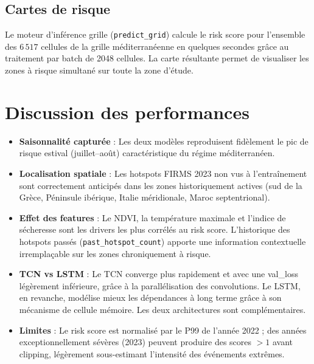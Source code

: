 \documentclass[12pt,a4paper]{report}
\begin{document}
\subsection{Cartes de risque}

Le moteur d'inférence grille (\texttt{predict\_grid}) calcule le risk score pour
l'ensemble des $6\,517$ cellules de la grille méditerranéenne en quelques secondes
grâce au traitement par batch de 2048 cellules. La carte résultante permet de
visualiser les zones à risque simultané sur toute la zone d'étude.

\section{Discussion des performances}

\begin{firebox}[title=Points clés d'analyse]
\begin{itemize}[leftmargin=*,itemsep=4pt]
  \item \textbf{Saisonnalité capturée} : Les deux modèles reproduisent fidèlement le
    pic de risque estival (juillet–août) caractéristique du régime méditerranéen.

  \item \textbf{Localisation spatiale} : Les hotspots FIRMS 2023 non vus à l'entraînement
    sont correctement anticipés dans les zones historiquement actives (sud de la Grèce,
    Péninsule ibérique, Italie méridionale, Maroc septentrional).

  \item \textbf{Effet des features} : Le NDVI, la température maximale et l'indice de
    sécheresse sont les drivers les plus corrélés au risk score. L'historique des
    hotspots passés (\texttt{past\_hotspot\_count}) apporte une information contextuelle
    irremplaçable sur les zones chroniquement à risque.

  \item \textbf{TCN vs LSTM} : Le TCN converge plus rapidement et avec une val\_loss
    légèrement inférieure, grâce à la parallélisation des convolutions. Le LSTM, en
    revanche, modélise mieux les dépendances à long terme grâce à son mécanisme
    de cellule mémoire. Les deux architectures sont complémentaires.

  \item \textbf{Limites} : Le risk score est normalisé par le P99 de l'année 2022 ;
    des années exceptionnellement sévères (2023) peuvent produire des scores $> 1$
    avant clipping, légèrement sous-estimant l'intensité des événements extrêmes.
\end{itemize}
\end{firebox}
\end{document}

